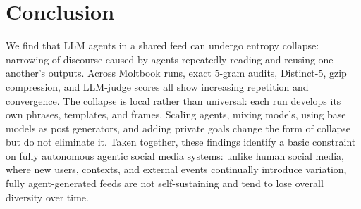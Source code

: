 \documentclass[11pt]{article}
\begin{document}
\section{Conclusion}
\label{sec:conclusion}
We find that LLM agents in a shared feed can undergo entropy collapse: narrowing of discourse caused by agents repeatedly reading and reusing one another's outputs. Across Moltbook runs, exact 5-gram audits, Distinct-5, gzip compression, and LLM-judge scores all show increasing repetition and convergence. The collapse is local rather than universal: each run develops its own phrases, templates, and frames. Scaling agents, mixing models, using base models as post generators, and adding private goals change the form of collapse but do not eliminate it. Taken together, these findings identify a basic constraint on fully autonomous agentic social media systems: unlike human social media, where new users, contexts, and external events continually introduce variation, fully agent-generated feeds are not self-sustaining and tend to lose overall diversity over time.




\end{document}
